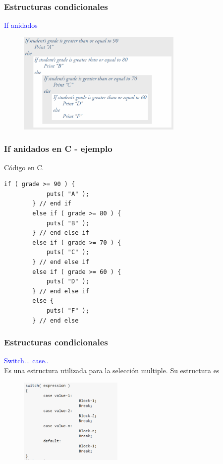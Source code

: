 \documentclass[10.5pt,scale=1.0,t,aspectratio=169,hyperref={pdfpagelabels=false}]{beamer}
\begin{document}
\begin{frame}
	\frametitle{Estructuras condicionales}
	\textcolor{blue}{\large If anidados} \\
	\begin{figure}
		\centering
		\includegraphics[width=8cm]{IfAnidado}
	\end{figure}	
\end{frame}

\begin{frame}[fragile]
	\frametitle{If anidados en C - ejemplo}
	
	Código en C.
	
	\begin{lstlisting}[style=CStyle]
		if ( grade >= 90 ) {
			puts( "A" );
		} // end if
		else if ( grade >= 80 ) {
			puts( "B" );
		} // end else if
		else if ( grade >= 70 ) {
			puts( "C" );
		} // end else if
		else if ( grade >= 60 ) {
			puts( "D" );
		} // end else if
		else {
			puts( "F" );
		} // end else
	\end{lstlisting}
	
\end{frame}


\begin{frame}
	\frametitle{Estructuras condicionales}
	\textcolor{blue}{\large Switch... case..} \\
	Es una estructura utilizada para la selección multiple. Su estructura es
	\begin{figure}
		\centering
		\includegraphics[width=5cm]{SwitchStructure}
	\end{figure}	
\end{frame}
\end{document}
